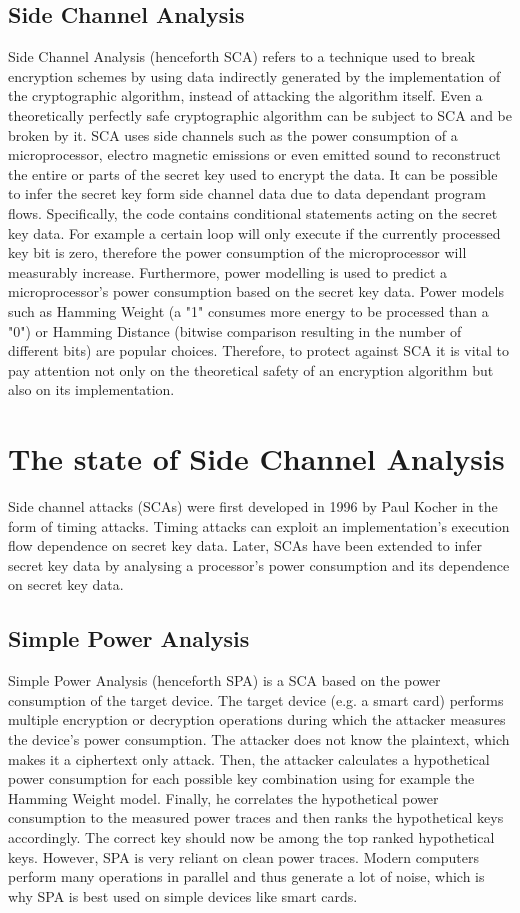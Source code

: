 \documentclass[journal]{IEEEtran}
\begin{document}
\subsection{Side Channel Analysis}
Side Channel Analysis (henceforth SCA) refers to a technique used to break encryption schemes by using data indirectly generated by the implementation of the cryptographic algorithm, instead of attacking the algorithm itself. Even a theoretically perfectly safe cryptographic algorithm can be subject to SCA and be broken by it. SCA uses side channels such as the power consumption of a microprocessor, electro magnetic emissions or even emitted sound to reconstruct the entire or parts of the secret key used to encrypt the data. It can be possible to infer the secret key form side channel data due to data dependant program flows. Specifically, the code contains conditional statements acting on the secret key data. For example a certain loop will only execute if the currently processed key bit is zero, therefore the power consumption of the microprocessor will measurably increase. Furthermore, power modelling is used to predict a microprocessor's power consumption based on the secret key data. Power models such as Hamming Weight (a "1" consumes more energy to be processed than a "0") or Hamming Distance (bitwise comparison resulting in the number of different bits) are popular choices. Therefore, to protect against SCA it is vital to pay attention not only on the theoretical safety of an encryption algorithm but also on its implementation.

\section{The state of Side Channel Analysis}
Side channel attacks (SCAs) were first developed in 1996 by Paul Kocher \cite{first-sca:kocher} in the form of timing attacks. Timing attacks can exploit an implementation's execution flow dependence on secret key data. Later, SCAs have been extended to infer secret key data by analysing a processor's power consumption and its dependence on secret key data. 

\subsection{Simple Power Analysis}
Simple Power Analysis (henceforth SPA) is a SCA based on the power consumption of the target device. The target device (e.g. a smart card) performs multiple encryption or decryption operations during which the attacker measures the device's power consumption. The attacker does not know the plaintext, which makes it a ciphertext only attack. Then, the attacker calculates a hypothetical power consumption for each possible key combination using for example the Hamming Weight model. Finally, he correlates the hypothetical power consumption to the measured power traces and then ranks the hypothetical keys accordingly. The correct key should now be among the top ranked hypothetical keys. However, SPA is very reliant on clean power traces. Modern computers perform many operations in parallel and thus generate a lot of noise, which is why SPA is best used on simple devices like smart cards. 
\end{document}
